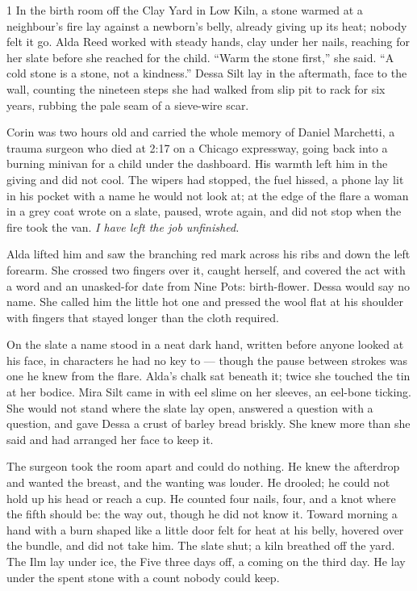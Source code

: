 \begin{CRchronicle}{1}
In the birth room off the Clay Yard in Low Kiln, a stone warmed at a neighbour’s fire lay against a newborn’s belly, already giving up its heat; nobody felt it go. Alda Reed worked with steady hands, clay under her nails, reaching for her slate before she reached for the child. “Warm the stone first,” she said. “A cold stone is a stone, not a kindness.” Dessa Silt lay in the aftermath, face to the wall, counting the nineteen steps she had walked from slip pit to rack for six years, rubbing the pale seam of a sieve-wire scar.

Corin was two hours old and carried the whole memory of Daniel Marchetti, a trauma surgeon who died at 2:17 on a Chicago expressway, going back into a burning minivan for a child under the dashboard. His warmth left him in the giving and did not cool. The wipers had stopped, the fuel hissed, a phone lay lit in his pocket with a name he would not look at; at the edge of the flare a woman in a grey coat wrote on a slate, paused, wrote again, and did not stop when the fire took the van. \emph{I have left the job unfinished.}

Alda lifted him and saw the branching red mark across his ribs and down the left forearm. She crossed two fingers over it, caught herself, and covered the act with a word and an unasked-for date from Nine Pots: birth-flower. Dessa would say no name. She called him the little hot one and pressed the wool flat at his shoulder with fingers that stayed longer than the cloth required.

On the slate a name stood in a neat dark hand, written before anyone looked at his face, in characters he had no key to --- though the pause between strokes was one he knew from the flare. Alda’s chalk sat beneath it; twice she touched the tin at her bodice. Mira Silt came in with eel slime on her sleeves, an eel-bone ticking. She would not stand where the slate lay open, answered a question with a question, and gave Dessa a crust of barley bread briskly. She knew more than she said and had arranged her face to keep it.

The surgeon took the room apart and could do nothing. He knew the afterdrop and wanted the breast, and the wanting was louder. He drooled; he could not hold up his head or reach a cup. He counted four nails, four, and a knot where the fifth should be: the way out, though he did not know it. Toward morning a hand with a burn shaped like a little door felt for heat at his belly, hovered over the bundle, and did not take him. The slate shut; a kiln breathed off the yard. The Ilm lay under ice, the Five three days off, a coming on the third day. He lay under the spent stone with a count nobody could keep.
\end{CRchronicle}
